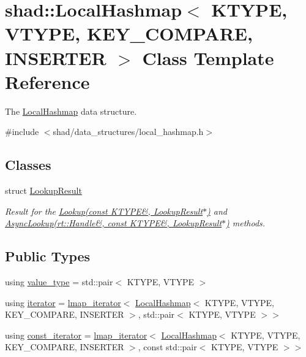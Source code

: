 \hypertarget{classshad_1_1LocalHashmap}{\section{shad\-:\-:Local\-Hashmap$<$ K\-T\-Y\-P\-E, V\-T\-Y\-P\-E, K\-E\-Y\-\_\-\-C\-O\-M\-P\-A\-R\-E, I\-N\-S\-E\-R\-T\-E\-R $>$ Class Template Reference}
\label{classshad_1_1LocalHashmap}
}


The \hyperlink{classshad_1_1LocalHashmap}{Local\-Hashmap} data structure.  




{\ttfamily \#include $<$shad/data\-\_\-structures/local\-\_\-hashmap.\-h$>$}

\subsection*{Classes}
\begin{DoxyCompactItemize}
\item 
struct \hyperlink{structshad_1_1LocalHashmap_1_1LookupResult}{Lookup\-Result}
\begin{DoxyCompactList}\small\item\em Result for the \hyperlink{classshad_1_1LocalHashmap_a9bd1b3780c1c676ce8d5eae265030080}{Lookup(const K\-T\-Y\-P\-E\&, Lookup\-Result$\ast$)} and \hyperlink{classshad_1_1LocalHashmap_a0328e22adb5dd53e819cc1791e802a56}{Async\-Lookup(rt\-::\-Handle\&, const K\-T\-Y\-P\-E\&, Lookup\-Result$\ast$)} methods. \end{DoxyCompactList}\end{DoxyCompactItemize}
\subsection*{Public Types}
\begin{DoxyCompactItemize}
\item 
using \hyperlink{classshad_1_1LocalHashmap_a3fa27c320a046745e01804325f15dd0e}{value\-\_\-type} = std\-::pair$<$ K\-T\-Y\-P\-E, V\-T\-Y\-P\-E $>$
\item 
using \hyperlink{classshad_1_1LocalHashmap_a130dbe16edd42ee7aa2e27eac6ee3cf4}{iterator} = \hyperlink{classshad_1_1lmap__iterator}{lmap\-\_\-iterator}$<$ \hyperlink{classshad_1_1LocalHashmap}{Local\-Hashmap}$<$ K\-T\-Y\-P\-E, V\-T\-Y\-P\-E, K\-E\-Y\-\_\-\-C\-O\-M\-P\-A\-R\-E, I\-N\-S\-E\-R\-T\-E\-R $>$, std\-::pair$<$ K\-T\-Y\-P\-E, V\-T\-Y\-P\-E $>$$>$
\item 
using \hyperlink{classshad_1_1LocalHashmap_ad5e054bdbc20f161cd8df8e00c525401}{const\-\_\-iterator} = \hyperlink{classshad_1_1lmap__iterator}{lmap\-\_\-iterator}$<$ \hyperlink{classshad_1_1LocalHashmap}{Local\-Hashmap}$<$ K\-T\-Y\-P\-E, V\-T\-Y\-P\-E, K\-E\-Y\-\_\-\-C\-O\-M\-P\-A\-R\-E, I\-N\-S\-E\-R\-T\-E\-R $>$, const std\-::pair$<$ K\-T\-Y\-P\-E, V\-T\-Y\-P\-E $>$$>$
\end{DoxyCompactItemize}
